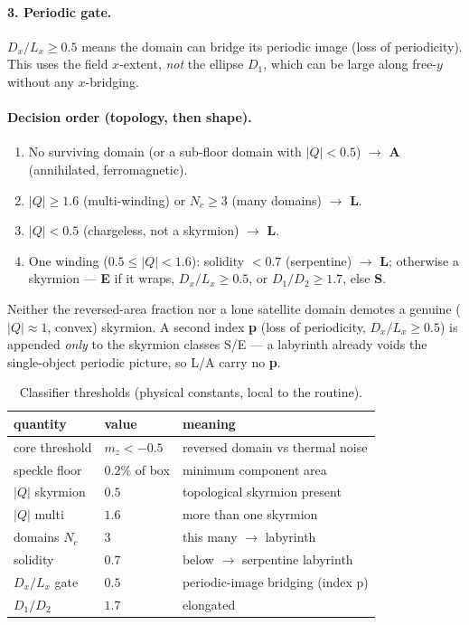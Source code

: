 \documentclass[11pt]{article}
\newcommand{\Q}{\lvert Q\rvert}
\begin{document}
\paragraph{3. Periodic gate.}
$D_x/L_x\ge0.5$ means the domain can bridge its periodic image (loss of
periodicity). This uses the field $x$-extent, \emph{not} the ellipse
$D_1$, which can be large along free-$y$ without any $x$-bridging.

\paragraph{Decision order (topology, then shape).}
\begin{enumerate}
  \item No surviving domain (or a sub-floor domain with $\Q<0.5$)
  $\rightarrow$ \textbf{A} (annihilated, ferromagnetic).
  \item $\Q\ge1.6$ (multi-winding) or $N_c\ge3$ (many domains)
  $\rightarrow$ \textbf{L}.
  \item $\Q<0.5$ (chargeless, not a skyrmion) $\rightarrow$ \textbf{L}.
  \item One winding ($0.5\le\Q<1.6$): solidity $<0.7$ (serpentine)
  $\rightarrow$ \textbf{L}; otherwise a skyrmion --- \textbf{E} if it
  wraps, $D_x/L_x\ge0.5$, or $D_1/D_2\ge1.7$, else \textbf{S}.
\end{enumerate}
Neither the reversed-area fraction nor a lone satellite domain demotes a
genuine ($\Q\approx1$, convex) skyrmion. A second index \textbf{p}
(loss of periodicity, $D_x/L_x\ge0.5$) is appended \emph{only} to the
skyrmion classes S/E --- a labyrinth already voids the single-object
periodic picture, so L/A carry no \textbf{p}.

\begin{table}[h]
\centering
\caption{Classifier thresholds (physical constants, local to the
routine).}
\begin{tabular}{lll}
\toprule
quantity & value & meaning\\
\midrule
core threshold & $m_z<-0.5$ & reversed domain vs thermal noise\\
speckle floor & $0.2\%$ of box & minimum component area\\
$\Q$ skyrmion & $0.5$ & topological skyrmion present\\
$\Q$ multi & $1.6$ & more than one skyrmion\\
domains $N_c$ & $3$ & this many $\rightarrow$ labyrinth\\
solidity & $0.7$ & below $\rightarrow$ serpentine labyrinth\\
$D_x/L_x$ gate & $0.5$ & periodic-image bridging (index p)\\
$D_1/D_2$ & $1.7$ & elongated\\
\bottomrule
\end{tabular}
\end{table}
\end{document}
